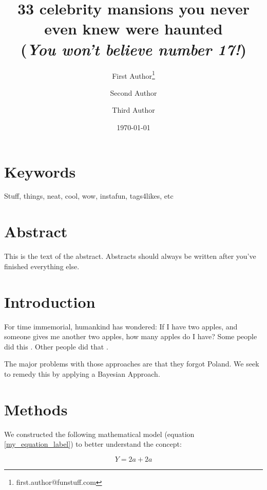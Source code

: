 \documentclass[11pt,letterpaper]{article} %
\date{\today}
\title{33 celebrity mansions you never even knew were haunted \\
(\textit{You won't believe number 17!})}
\author[1]{First Author\thanks{first.author@funstuff.com}}
\author[1,2]{Second Author}
\author[2]{Third Author}
\affil[1]{Department of Computer Science, \LaTeX\ University}
\affil[2]{Department of Mechanical Engineering, Superfabulous University}
\begin{document}
\maketitle


\section*{Keywords}
Stuff, things, neat, cool, wow, instafun, tags4likes, etc

\linenumbers %
\def\linenumberfont{\normalfont\small\rmfamily} %

\section*{Abstract}
This is the text of the abstract.
Abstracts should always be written after you've finished everything else.

\section*{Introduction}
For time immemorial, humankind has wondered: If I have two apples, and someone gives me another two apples, how many apples do I have? Some people did this \citep{Darwin1859}. Other people did that \citep{Wallace1869}.

The major problems with those approaches are that they forgot Poland.
We seek to remedy this by applying a Bayesian Approach.

\section*{Methods}
We constructed the following mathematical model (equation \ref{my_equation_label}) to better understand the concept:

\begin{equation}\label{my_equation_label}
	Y = 2a + 2a
\end{equation}
\end{document}
